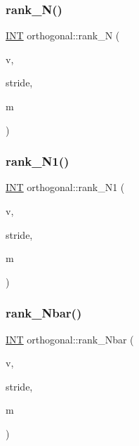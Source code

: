 \subsubsection{\texorpdfstring{rank\+\_\+\+N()}{rank\_N()}}
{\footnotesize\ttfamily \mbox{\hyperlink{galois_8h_a09fddde158a3a20bd2dcadb609de11dc}{I\+NT}} orthogonal\+::rank\+\_\+N (\begin{DoxyParamCaption}\item[{\mbox{\hyperlink{galois_8h_a09fddde158a3a20bd2dcadb609de11dc}{I\+NT}} $\ast$}]{v,  }\item[{\mbox{\hyperlink{galois_8h_a09fddde158a3a20bd2dcadb609de11dc}{I\+NT}}}]{stride,  }\item[{\mbox{\hyperlink{galois_8h_a09fddde158a3a20bd2dcadb609de11dc}{I\+NT}}}]{m }\end{DoxyParamCaption})}

\mbox{\label{classorthogonal_a10b99e279ae3624531756ea2723b59e7}} 
\subsubsection{\texorpdfstring{rank\+\_\+\+N1()}{rank\_N1()}}
{\footnotesize\ttfamily \mbox{\hyperlink{galois_8h_a09fddde158a3a20bd2dcadb609de11dc}{I\+NT}} orthogonal\+::rank\+\_\+\+N1 (\begin{DoxyParamCaption}\item[{\mbox{\hyperlink{galois_8h_a09fddde158a3a20bd2dcadb609de11dc}{I\+NT}} $\ast$}]{v,  }\item[{\mbox{\hyperlink{galois_8h_a09fddde158a3a20bd2dcadb609de11dc}{I\+NT}}}]{stride,  }\item[{\mbox{\hyperlink{galois_8h_a09fddde158a3a20bd2dcadb609de11dc}{I\+NT}}}]{m }\end{DoxyParamCaption})}

\mbox{\label{classorthogonal_abef914a30b0016465fc5c70650d97426}} 
\subsubsection{\texorpdfstring{rank\+\_\+\+Nbar()}{rank\_Nbar()}}
{\footnotesize\ttfamily \mbox{\hyperlink{galois_8h_a09fddde158a3a20bd2dcadb609de11dc}{I\+NT}} orthogonal\+::rank\+\_\+\+Nbar (\begin{DoxyParamCaption}\item[{\mbox{\hyperlink{galois_8h_a09fddde158a3a20bd2dcadb609de11dc}{I\+NT}} $\ast$}]{v,  }\item[{\mbox{\hyperlink{galois_8h_a09fddde158a3a20bd2dcadb609de11dc}{I\+NT}}}]{stride,  }\item[{\mbox{\hyperlink{galois_8h_a09fddde158a3a20bd2dcadb609de11dc}{I\+NT}}}]{m }\end{DoxyParamCaption})}

